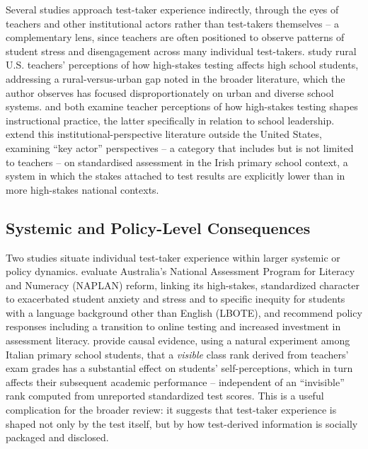 \documentclass[11pt]{article}
\begin{document}
Several studies approach test-taker experience indirectly, through the eyes of teachers and other institutional actors rather than test-takers themselves -- a complementary lens, since teachers are often positioned to observe patterns of student stress and disengagement across many individual test-takers. \citet{steuart2024ruralteachers} study rural U.S. teachers' perceptions of how high-stakes testing affects high school students, addressing a rural-versus-urban gap noted in the broader literature, which the author observes has focused disproportionately on urban and diverse school systems. \citet{weick2024instruction} and \citet{reese2004teachersperceptions} both examine teacher perceptions of how high-stakes testing shapes instructional practice, the latter specifically in relation to school leadership. \citet{mccauley2021irish} extend this institutional-perspective literature outside the United States, examining ``key actor'' perspectives -- a category that includes but is not limited to teachers -- on standardised assessment in the Irish primary school context, a system in which the stakes attached to test results are explicitly lower than in more high-stakes national contexts.

\subsection{Systemic and Policy-Level Consequences}

Two studies situate individual test-taker experience within larger systemic or policy dynamics. \citet{zhangw2024naplan} evaluate Australia's National Assessment Program for Literacy and Numeracy (NAPLAN) reform, linking its high-stakes, standardized character to exacerbated student anxiety and stress and to specific inequity for students with a language background other than English (LBOTE), and recommend policy responses including a transition to online testing and increased investment in assessment literacy. \citet{ladant2023saliency} provide causal evidence, using a natural experiment among Italian primary school students, that a \emph{visible} class rank derived from teachers' exam grades has a substantial effect on students' self-perceptions, which in turn affects their subsequent academic performance -- independent of an ``invisible'' rank computed from unreported standardized test scores. This is a useful complication for the broader review: it suggests that test-taker experience is shaped not only by the test itself, but by how test-derived information is socially packaged and disclosed.
\end{document}
